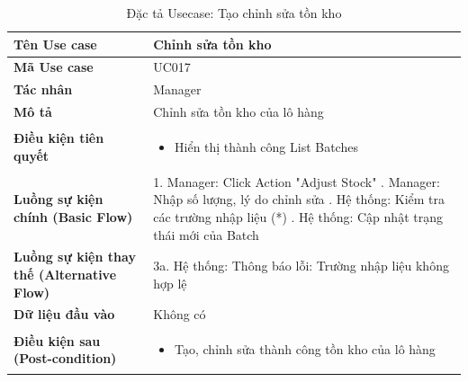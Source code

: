 \documentclass[12pt,a4paper]{report}
\begin{document}
\vspace{0.5cm}

\begin{longtable}{|>{\raggedright\arraybackslash\bfseries}p{4.5cm}|p{11cm}|}
\caption{Đặc tả Usecase: Tạo chỉnh sửa tồn kho} \label{tab:uc_edit_inventory} \\
\hline
Tên Use case & Chỉnh sửa tồn kho \\ \hline
Mã Use case & UC017 \\ \hline
Tác nhân & Manager \\ \hline
Mô tả & Chỉnh sửa tồn kho của lô hàng \\ \hline
Điều kiện tiên quyết & 
\begin{itemize}[leftmargin=*, nosep, topsep=0pt, partopsep=0pt]
    \item Hiển thị thành công List Batches
\end{itemize} \\ \hline
Luồng sự kiện chính (Basic Flow) & 
1. Manager: Click Action "Adjust Stock" \newline
2. Manager: Nhập số lượng, lý do chỉnh sửa \newline
3. Hệ thống: Kiểm tra các trường nhập liệu (*) \newline
4. Hệ thống: Cập nhật trạng thái mới của Batch \\ \hline
Luồng sự kiện thay thế (Alternative Flow) & 
3a. Hệ thống: Thông báo lỗi: Trường nhập liệu không hợp lệ \\ \hline
Dữ liệu đầu vào & Không có \\ \hline
Điều kiện sau (Post-condition) & 
\begin{itemize}[leftmargin=*, nosep, topsep=0pt, partopsep=0pt]
    \item Tạo, chỉnh sửa thành công tồn kho của lô hàng
\end{itemize} \\ \hline
\end{longtable}

\vspace{0.5cm}
\end{document}
